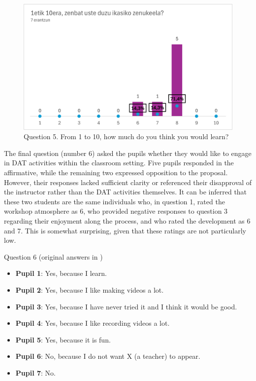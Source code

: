 \begin{figure}[htbp]
    \centering
    \begin{minipage}{.5\textwidth}
    \includegraphics[width=\textwidth]{fig05.png}
    \caption{Question 5. From 1 to 10, how much do you think you
    would learn?}
    \label{fig-05}
    \end{minipage}
\end{figure}

The final question (number 6) asked the pupils whether they would
like to engage in DAT activities within the classroom setting. Five
pupils responded in the affirmative, while the remaining two expressed
opposition to the proposal. However, their responses lacked sufficient
clarity or referenced their disapproval of the instructor rather than
the DAT activities themselves. It can be inferred that these two
students are the same individuals who, in question 1, rated the workshop
atmosphere as 6, who provided negative responses to question 3 regarding
their enjoyment along the process, and who rated the development as 6
and 7. This is somewhat surprising, given that these ratings are not
particularly low.

Question 6 (original answers in )

\begin{itemize}
    \item \textbf{Pupil 1}: Yes, because I learn.
    \item \textbf{Pupil 2}: Yes, because I like making videos a lot.
    \item \textbf{Pupil 3}: Yes, because I have never tried it and I think it would be good.
    \item \textbf{Pupil 4}: Yes, because I like recording videos a lot.
    \item \textbf{Pupil 5}: Yes, because it is fun.
    \item \textbf{Pupil 6}: No, because I do not want X (a teacher) to appear.
    \item \textbf{Pupil 7}: No.
\end{itemize}

